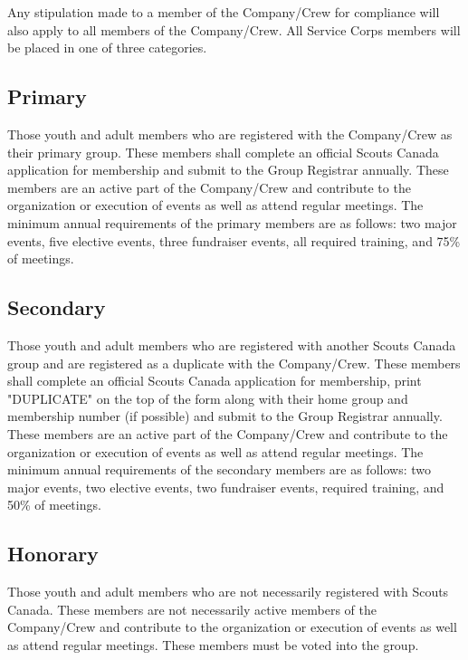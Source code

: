 Any stipulation made to a member of the Company/Crew for compliance will also apply to all members of the Company/Crew.
All Service Corps members will be placed in one of three categories.
\subsection{Primary}
Those youth and adult members who are registered with the Company/Crew as their primary group.
These members shall complete an official Scouts Canada application for membership and submit to the Group Registrar annually.
These members are an active part of the Company/Crew and contribute to the organization or execution of events as well as attend regular meetings.
The minimum annual requirements of the primary members are as follows: two major events, five elective events, three fundraiser events, all required training, and 75\% of meetings.
\subsection{Secondary}
Those youth and adult members who are registered with another Scouts Canada group and are registered as a duplicate with the Company/Crew.
These members shall complete an official Scouts Canada application for membership, print "DUPLICATE" on the top of the form along with their home group and membership number (if possible) and submit to the Group Registrar annually.
These members are an active part of the Company/Crew and contribute to the organization or execution of events as well as attend regular meetings.
The minimum annual requirements of the secondary members are as follows: two major events, two elective events, two fundraiser events, required training, and 50\% of meetings.
\subsection{Honorary}
Those youth and adult members who are not necessarily registered with Scouts Canada.
These members are not necessarily active members of the Company/Crew and contribute to the organization or execution of events as well as attend regular meetings.
These members must be voted into the group.

